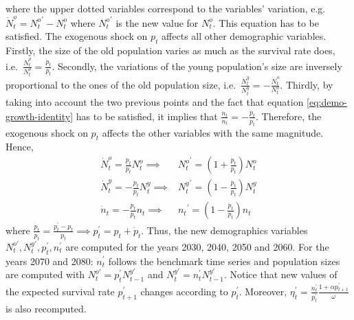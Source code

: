\documentclass[
]{article}
\begin{document}
where the upper dotted variables correspond to the variables' variation, e.g.~\(\dot{N}_t^o = {N_t^o}^\prime - N_t^o\) where \({N_t^o}^\prime\) is the new value for \(N_t^o\). This equation has to be satisfied. The exogenous shock on \(p_t\) affects all other demographic variables. Firstly, the size of the old population varies as much as the survival rate does, i.e.~\(\frac{\dot{N}_t^o}{N_t^o} = \frac{\dot{p}_t}{p_t}\). Secondly, the variations of the young population's size are inversely proportional to the ones of the old population size, i.e.~\(\frac{\dot{N}_t^y}{N_t^y} = -\frac{\dot{N}_t^o}{N_t^o}\). Thirdly, by taking into account the two previous points and the fact that equation \eqref{eq:demo-growth-identity} has to be satisfied, it implies that \(\frac{\dot{n}_t}{n_t} = -\frac{\dot{p}_t}{p_t}\). Therefore, the exogenous shock on \(p_t\) affects the other variables with the same magnitude.
Hence,
\begin{align*}
    \dot{N}^o_t = \frac{\dot{p}_t}{p_t} N^o_t \implies& {N^o_t}^\prime = \left(1+\frac{\dot{p}_t}{p_t}\right) N^o_t \\
    \dot{N}^y_t = -\frac{\dot{p}_t}{p_t} N^y_t \implies& {N^y_t}^\prime = \left(1-\frac{\dot{p}_t}{p_t}\right) N^y_t \\
    \dot{n}_t = -\frac{\dot{p}_t}{p_t} n_t \implies& {n_t}^\prime = \left(1-\frac{\dot{p}_t}{p_t}\right) n_t
\end{align*}
where \(\frac{\dot{p}_t}{p_t} = \frac{p^\prime_t - p_t}{p_t} \implies p^\prime_t = p_t + \dot{p}_t\). Thus, the new demographics variables \(N^{o\prime}_t, N^{y\prime}_t, p^\prime_t, n^\prime_t\) are computed for the years 2030, 2040, 2050 and 2060. For the years 2070 and 2080: \(n^\prime_t\) follows the benchmark time series and population sizes are computed with \(N^{o\prime}_t = p^\prime_t {N^{y\prime}_{t-1}}\) and \(N^{y\prime}_t = n^\prime_t N^{y\prime}_{t-1}\). Notice that new values of the expected survival rate \(p^\prime_{t+1}\) changes according to \(p^\prime_t\). Moreover, \(\eta^\prime_t = \frac{n^\prime_t}{p^\prime_t}\frac{1+\alpha p^\prime_{t+1}}{\omega}\) is also recomputed.
\end{document}
